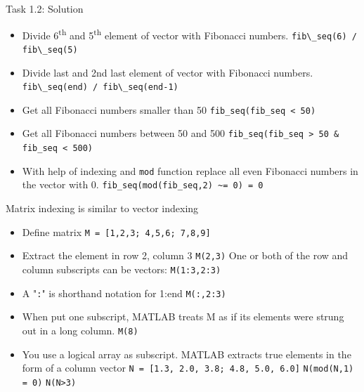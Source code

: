 \begin{frame}{Task 1.2: Solution}
\begin{itemize}
    \item Divide 6\textsuperscript{th} and 5\textsuperscript{th} element of vector with Fibonacci numbers.
    \newline \lstinline{fib\_seq(6) / fib\_seq(5)}
    \item Divide last and 2nd last element of vector with Fibonacci numbers. 
    \newline \lstinline{fib\_seq(end) / fib\_seq(end-1)}
    \item Get all Fibonacci numbers smaller than 50 
    \newline \lstinline{fib_seq(fib_seq < 50)}
     \item Get all Fibonacci numbers between 50 and 500
    \newline \lstinline{fib_seq(fib_seq > 50 & fib_seq < 500)}
    \item With help of indexing and \lstinline{mod} function replace all even Fibonacci numbers in the vector with 0.
    \newline \lstinline{fib_seq(mod(fib_seq,2) ~= 0) = 0}
\end{itemize}
\end{frame}

\begin{frame}{Matrix indexing is similar to vector indexing}
\small
\begin{itemize}
    \item Define matrix
    \newline \lstinline{M = [1,2,3; 4,5,6; 7,8,9]}
    \item Extract the element in row 2, column 3
    \newline \lstinline{M(2,3)}
    One or both of the row and column subscripts can be vectors:
    \newline \lstinline{M(1:3,2:3)}
    \item A  "\lstinline{:}"  is shorthand notation for 1:end 
    \newline \lstinline{M(:,2:3)}
    \item When put one subscript, MATLAB treats M as if its elements were strung out in a long column.
    \newline \lstinline{M(8)}
    \item You use a logical array as subscript. MATLAB extracts true elements in the form of a column vector
    \newline \lstinline{N = [1.3, 2.0, 3.8; 4.8, 5.0, 6.0]}
    \newline \lstinline{N(mod(N,1) = 0)} 
    \newline \lstinline{N(N>3)}
\end{itemize}
\end{frame}


